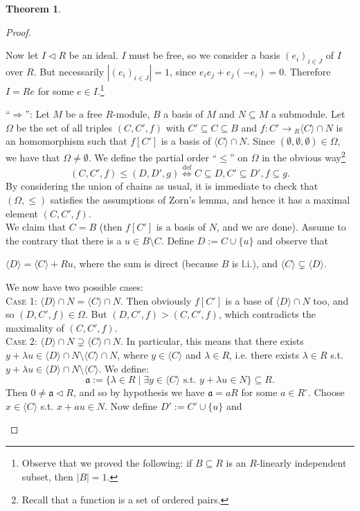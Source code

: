 \documentclass[12pt,a4paper]{report}
\theoremstyle{definition}
\newtheorem{theorem}{Theorem}[chapter] %
\theoremstyle{num.custom-title}
\DeclareMathOperator{\imp}{\Rightarrow}
\DeclareMathOperator{\sm}{\setminus}
\DeclareMathOperator{\sse}{\subseteq}
\renewcommand{\iff}{\Leftrightarrow}
\begin{document}
\begin{theorem}
\begin{proof}
\begin{enumerate}
Now let $I \lhd R$ be an ideal. $I$ must be free, so we consider a basis $(e_i)_{i \in J}$ of $I$ over $R$. But necessarily $|(e_i)_{i \in J}|=1$, since $e_i e_j + e_j (-e_i) = 0$. Therefore $I = R e$ for some $e \in I$.\footnote{Observe that we proved the following: if $B \sse R$ is an $R$-linearly independent subset, then $|B|=1$.}

``$\imp$'': Let $M$ be a free $R$-module, $B$ a basis of $M$ and $N \sse M$ a submodule. Let $\Omega$ be the set of all triples $(C,C',f)$ with $C' \sse C \sse B$ and $f: C' \to {}_R \langle C \rangle \cap N$ is an homomorphism such that $f[C']$ is a basis of $\langle C \rangle \cap N$. Since $(\emptyset, \emptyset, \emptyset) \in \Omega$, we have that $\Omega \neq \emptyset$. We define the partial order ``$\leq$'' on $\Omega$ in the obvious way\footnote{Recall that a function is a set of ordered pairs.}
\[
(C,C',f) \leq (D,D',g) \stackrel{\text{def}}{\iff} C \sse D, C' \sse D', f \sse g.
\]
By considering the union of chains as usual, it is immediate to check that $(\Omega,\leq)$ satisfies the assumptions of Zorn's lemma, and hence it has a maximal element $(C,C',f)$.\\
We claim that $C=B$ (then $f[C']$ is a basis of $N$, and we are done). Assume to the contrary that there is a $u \in B \sm C$. Define $D := C \cup \{u\}$ and observe that
\begin{center}
$\langle D \rangle = \langle C \rangle + Ru$, where the sum is direct (because $B$ is l.i.), and $\langle C \rangle \subsetneq \langle D \rangle$.
\end{center}
We now have two possible cases:\\
\textsc{Case 1:} $\langle D \rangle \cap N = \langle C \rangle \cap N$. Then obviously $f[C']$ is a base of $\langle D \rangle \cap N$ too, and so $(D,C',f) \in \Omega$. But $(D,C',f) > (C,C',f)$, which contradicts the maximality of $(C,C',f)$.\\
\textsc{Case 2:} $\langle D \rangle \cap N \supsetneq \langle C \rangle \cap N$. In particular, this means that there exists $y+\lambda u \in \langle D \rangle \cap N \sm \langle C \rangle \cap N$, where $y \in \langle C \rangle$ and $\lambda \in R$, i.e. there exists $\lambda \in R$ s.t. $y+\lambda u \in \langle D \rangle \cap N \sm \langle C \rangle$. We define:
\[
\mathfrak{a} := \{\lambda \in R \mid \exists y \in \langle C \rangle \text{ s.t. } y + \lambda u \in N\} \sse R.
\]
Then $0 \neq \mathfrak{a} \lhd R$, and so by hypothesis we have $\mathfrak{a} = aR$ for some $a \in R^\circ$. Choose $x \in \langle C \rangle$ s.t. $x + au \in N$. Now define $D' := C' \cup \{u\}$ and

\end{enumerate}
\end{proof}
\end{theorem}
\end{document}
